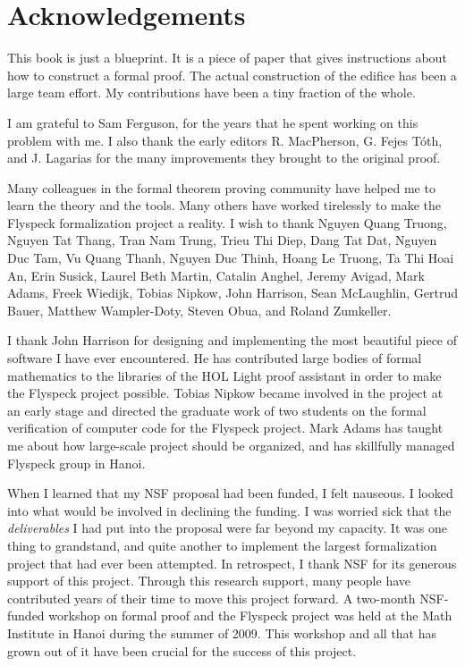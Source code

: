 

\section*{Acknowledgements}

This book is just a blueprint.  It is a piece of paper that gives instructions
about how to construct a formal proof.  The actual construction of the edifice
has been a large team effort.  My contributions have been a tiny fraction of the whole.

I am grateful to Sam Ferguson, for the years that
he spent working on this problem with me.  I also thank the early editors
R. MacPherson, G. Fejes T\'oth, and J. Lagarias for the many improvements
they brought to the original proof.

Many colleagues in the formal theorem proving community have helped me
to learn the theory and the tools.  Many others have worked tirelessly
 to make the Flyspeck formalization project a reality.  I wish to thank
Nguyen Quang Truong, %
Nguyen Tat Thang, %
Tran Nam Trung,
Trieu Thi Diep, Dang Tat Dat, Nguyen Duc Tam, Vu Quang Thanh, Nguyen
Duc Thinh, Hoang Le Truong, Ta Thi Hoai An, Erin Susick, Laurel Beth Martin, Catalin
Anghel, Jeremy Avigad, Mark Adams, Freek Wiedijk, Tobias Nipkow, John
Harrison, Sean McLaughlin, Gertrud Bauer, Matthew Wampler-Doty, Steven
Obua, and Roland Zumkeller. 

 I thank John Harrison for designing and implementing the most beautiful piece of
 software I have ever encountered.  He has contributed large bodies of formal mathematics to
the libraries of the HOL Light proof assistant in order to make the Flyspeck project
possible.   Tobias Nipkow became involved in the project at an early stage and
directed the graduate work of two students on the formal verification of computer
code for the Flyspeck project. Mark Adams has taught me about how
 large-scale project should be organized, and has skillfully managed 
  Flyspeck group in Hanoi.

  When I learned that my NSF proposal had been funded, I felt
  nauseous.  I looked into what would be involved in declining the
  funding.  I was  worried sick that the {\it deliverables} I had put
  into the proposal were far beyond my capacity.  It was one thing to
  grandstand, and quite another to implement the largest
  formalization project that had ever been attempted.  In retrospect, I
  thank NSF for its generous support of this project.  Through this
  research support, many people have contributed years of their time to move this
  project forward.  A two-month NSF-funded workshop on formal proof
  and the Flyspeck project was held at the Math Institute in Hanoi during the summer of
  2009.  This workshop and all that has grown out of it have been crucial for
  the success of this project.


